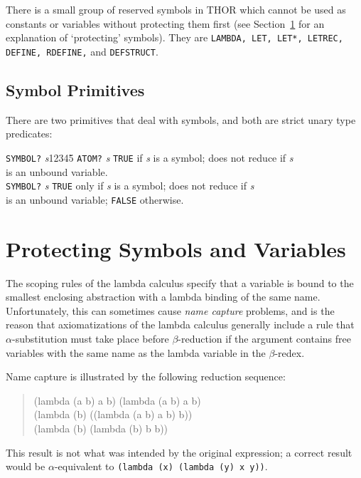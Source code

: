 	There is a small group of reserved symbols in THOR which cannot
be used as constants or variables without protecting them first (see
Section~\ref{sec-protect} for an explanation of `protecting' symbols). 
They are {\tt LAMBDA, LET, LET*, LETREC, DEFINE, RDEFINE,} and 
{\tt DEFSTRUCT}.

\subsection{Symbol Primitives}

	There are two primitives that deal with symbols, and both are strict
unary type predicates: 
\begin{tabbing}
{\tt SYMBOL?} {\sl s}12345\=\kill
{\tt ATOM?} {\sl s} \> {\tt TRUE} if {\sl s} is a symbol; does
not reduce if {\sl s} \\ \> is an unbound variable. \\
{\tt SYMBOL?} {\sl s} \> {\tt TRUE} only if {\sl s} is a symbol; does
not reduce if {\sl s} \\  \>is an unbound variable; {\tt FALSE}
otherwise.
\end{tabbing}



\section{Protecting Symbols and Variables}
\label{sec-protect}

	The scoping rules of the lambda calculus specify that a variable is
bound to the smallest enclosing abstraction with a lambda binding of 
the same name. Unfortunately, this can sometimes cause {\em name capture}
problems, and is the 
reason that 
axiomatizations of the lambda calculus generally include a rule that
$\alpha$-substitution must take place before $\beta$-reduction if the
argument contains free variables with the same name as the lambda variable in
the $\beta$-redex.  

Name capture is illustrated by the following reduction sequence:
\begin{quote}\begin{tt}
	(lambda (a b) a b) (lambda (a b) a b) \reds\\
	(lambda (b) ((lambda (a b) a b) b)) \reds\\
	(lambda (b) (lambda (b) b b))
\end{tt}\end{quote}
This result is not what was intended by the original expression;  a
correct result would be $\alpha$-equivalent to 
{\mbox{\tt (lambda (x) (lambda (y) x y))}}.  

